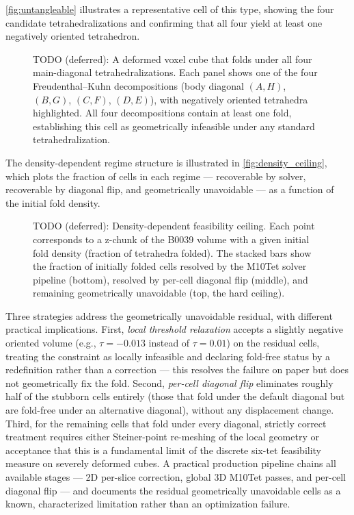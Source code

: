 \autoref{fig:untangleable} illustrates a representative cell of this type, showing the four candidate tetrahedralizations and confirming that all four yield at least one negatively oriented tetrahedron.

\begin{figure}[ht]\centering
\caption{TODO (deferred): A deformed voxel cube that folds under all four main-diagonal tetrahedralizations. Each panel shows one of the four Freudenthal--Kuhn decompositions (body diagonal $(A,H)$, $(B,G)$, $(C,F)$, $(D,E)$), with negatively oriented tetrahedra highlighted. All four decompositions contain at least one fold, establishing this cell as geometrically infeasible under any standard tetrahedralization.}
\label{fig:untangleable}
\end{figure}

The density-dependent regime structure is illustrated in \autoref{fig:density_ceiling}, which plots the fraction of cells in each regime --- recoverable by solver, recoverable by diagonal flip, and geometrically unavoidable --- as a function of the initial fold density.

\begin{figure}[ht]\centering
\caption{TODO (deferred): Density-dependent feasibility ceiling. Each point corresponds to a z-chunk of the B0039 volume with a given initial fold density (fraction of tetrahedra folded). The stacked bars show the fraction of initially folded cells resolved by the M10Tet solver pipeline (bottom), resolved by per-cell diagonal flip (middle), and remaining geometrically unavoidable (top, the hard ceiling).}
\label{fig:density_ceiling}
\end{figure}

Three strategies address the geometrically unavoidable residual, with different practical implications. First, \emph{local threshold relaxation} accepts a slightly negative oriented volume (e.g., $\tau = -0.013$ instead of $\tau = 0.01$) on the residual cells, treating the constraint as locally infeasible and declaring fold-free status by a redefinition rather than a correction --- this resolves the failure on paper but does not geometrically fix the fold. Second, \emph{per-cell diagonal flip} eliminates roughly half of the stubborn cells entirely (those that fold under the default diagonal but are fold-free under an alternative diagonal), without any displacement change. Third, for the remaining cells that fold under every diagonal, strictly correct treatment requires either Steiner-point re-meshing of the local geometry or acceptance that this is a fundamental limit of the discrete six-tet feasibility measure on severely deformed cubes. A practical production pipeline chains all available stages --- 2D per-slice correction, global 3D M10Tet passes, and per-cell diagonal flip --- and documents the residual geometrically unavoidable cells as a known, characterized limitation rather than an optimization failure.

